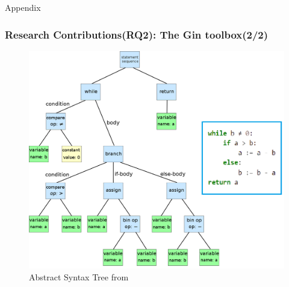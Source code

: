 \documentclass{beamer}
\begin{document}
\begin{frame}{Appendix}
\label{appendix}
\hypertarget{Gin_toolbox_2}{}
  \frametitle{Research Contributions(RQ2): The Gin toolbox(2/2)}
  
   \begin{figure}
    \centering
    \includegraphics[width=.7\textwidth]{figures/Slide_19(Abstract syntax tree).png}
    \captionsetup{justification=centering} %
    \caption{Abstract Syntax Tree from \cite{hung2014rule}}
  \end{figure}
  
\end{frame}
\end{document}
